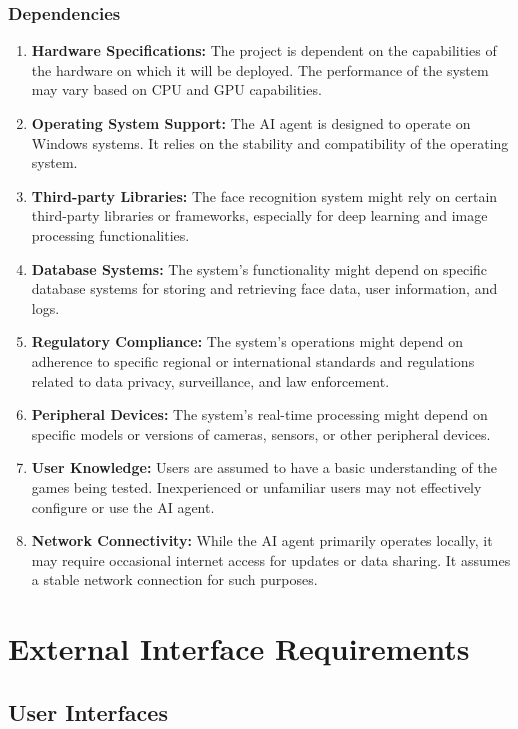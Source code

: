         \subsubsection{Dependencies}
            \begin{enumerate}
                \item \textbf{Hardware Specifications:} The project is dependent on the capabilities of the hardware on which it will be deployed. The performance of the system may vary based on CPU and GPU capabilities.
                \item \textbf{Operating System Support:} The AI agent is designed to operate on Windows systems. It relies on the stability and compatibility of the operating system.
                \item \textbf{Third-party Libraries:} The face recognition system might rely on certain third-party libraries or frameworks, especially for deep learning and image processing functionalities.
                \item \textbf{Database Systems:} The system's functionality might depend on specific database systems for storing and retrieving face data, user information, and logs.
                \item \textbf{Regulatory Compliance:} The system's operations might depend on adherence to specific regional or international standards and regulations related to data privacy, surveillance, and law enforcement.
                \item \textbf{Peripheral Devices:} The system's real-time processing might depend on specific models or versions of cameras, sensors, or other peripheral devices.
                \item \textbf{User Knowledge:} Users are assumed to have a basic understanding of the games being tested. Inexperienced or unfamiliar users may not effectively configure or use the AI agent.
                \item \textbf{Network Connectivity:} While the AI agent primarily operates locally, it may require occasional internet access for updates or data sharing. It assumes a stable network connection for such purposes.
            \end{enumerate}


\section{External Interface Requirements}
    \subsection{User Interfaces}
